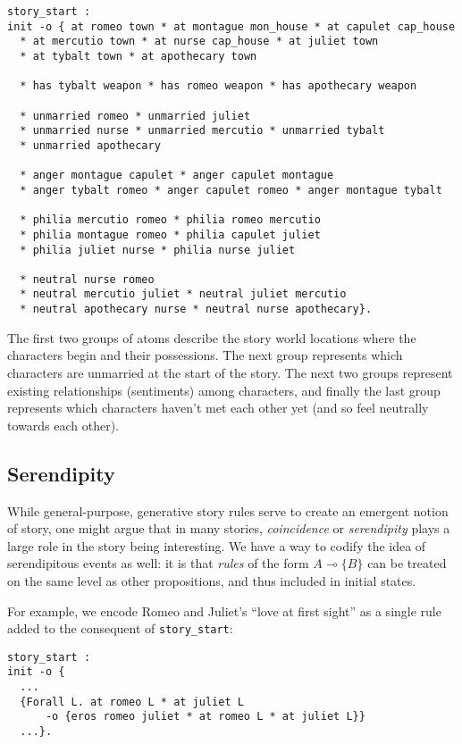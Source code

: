 \documentclass[letterpaper]{article}
\newcommand{\lolli}{\multimap}
\newcommand{\mon}[1]{\{#1\}}
\begin{document}
\begin{verbatim}
story_start :
init -o { at romeo town * at montague mon_house * at capulet cap_house
  * at mercutio town * at nurse cap_house * at juliet town
  * at tybalt town * at apothecary town

  * has tybalt weapon * has romeo weapon * has apothecary weapon

  * unmarried romeo * unmarried juliet
  * unmarried nurse * unmarried mercutio * unmarried tybalt
  * unmarried apothecary

  * anger montague capulet * anger capulet montague
  * anger tybalt romeo * anger capulet romeo * anger montague tybalt

  * philia mercutio romeo * philia romeo mercutio
  * philia montague romeo * philia capulet juliet
  * philia juliet nurse * philia nurse juliet

  * neutral nurse romeo
  * neutral mercutio juliet * neutral juliet mercutio
  * neutral apothecary nurse * neutral nurse apothecary}.
\end{verbatim}

The first two groups of atoms describe the story world locations where
the characters begin and their possessions. The next group represents which
characters are unmarried at the start of the story. The next two groups
represent existing relationships (sentiments)  among characters, and
finally the last group represents which characters haven't met each other
yet (and so feel neutrally towards each other).

\subsection{Serendipity}

While general-purpose, generative story rules serve to create an emergent
notion of story, one might argue that in many stories, {\em coincidence} or
{\em serendipity} plays a large role in the story being interesting. We
have a way to codify the idea of serendipitous events as well: it is that
{\em rules} of the form $A \lolli \mon{B}$ can be treated on the same level as
other propositions, and thus included in initial states.

For example, we encode Romeo and Juliet's ``love at first sight'' as a
single rule added to the consequent of \verb|story_start|:

\begin{verbatim}
story_start :
init -o {
  ...
  {Forall L. at romeo L * at juliet L
      -o {eros romeo juliet * at romeo L * at juliet L}}
  ...}.
\end{verbatim}
\end{document}
